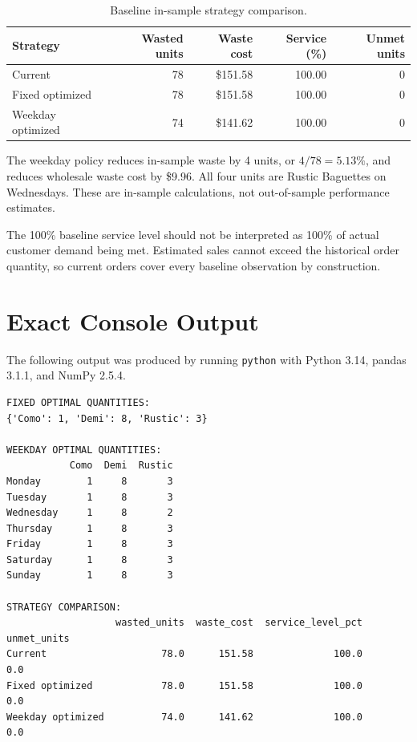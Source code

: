 \documentclass[11pt]{article}
\begin{document}
\begin{table}[htbp]
\centering
\caption{Baseline in-sample strategy comparison.}
\label{tab:baseline}
\begin{tabular}{@{}lrrrr@{}}
\toprule
Strategy & Wasted units & Waste cost & Service (\%) & Unmet units \\
\midrule
Current           & 78 & \$151.58 & 100.00 & 0 \\
Fixed optimized   & 78 & \$151.58 & 100.00 & 0 \\
Weekday optimized & 74 & \$141.62 & 100.00 & 0 \\
\bottomrule
\end{tabular}
\end{table}

The weekday policy reduces in-sample waste by 4 units, or
$4/78=5.13\%$, and reduces wholesale waste cost by \$9.96.  All four units are
Rustic Baguettes on Wednesdays.  These are in-sample calculations, not
out-of-sample performance estimates.

The 100\% baseline service level should not be interpreted as 100\% of actual
customer demand being met.  Estimated sales cannot exceed the historical
order quantity, so current orders cover every baseline observation by
construction.

\section{Exact Console Output}

The following output was produced by running \texttt{python}
 with Python 3.14, pandas 3.1.1, and
NumPy 2.5.4.

\begin{lstlisting}[style=output]
FIXED OPTIMAL QUANTITIES:
{'Como': 1, 'Demi': 8, 'Rustic': 3}

WEEKDAY OPTIMAL QUANTITIES:
           Como  Demi  Rustic
Monday        1     8       3
Tuesday       1     8       3
Wednesday     1     8       2
Thursday      1     8       3
Friday        1     8       3
Saturday      1     8       3
Sunday        1     8       3

STRATEGY COMPARISON:
                   wasted_units  waste_cost  service_level_pct  unmet_units
Current                    78.0      151.58              100.0          0.0
Fixed optimized            78.0      151.58              100.0          0.0
Weekday optimized          74.0      141.62              100.0          0.0
\end{lstlisting}
\end{document}
